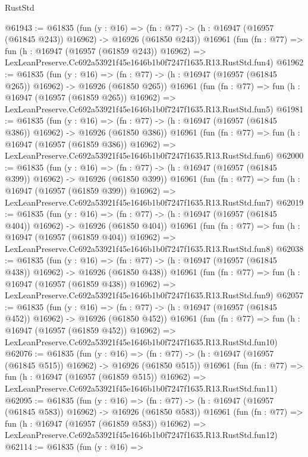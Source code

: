 \begin{lexlean}{RustStd}
\begin{coremodule}
@61943 := @61835
    (fun (y : @16) =>
    (fn : @77) -> (h : @16947 (@16957 (@61845 @243)) @16962) -> @16926 (@61850 @243))
    @16961
    (fun (fn : @77) =>
    fun (h : @16947 (@16957 (@61859 @243)) @16962) =>
    LexLeanPreserve.Cc692a53921f45e1646b1b0f7247f1635.R13.RustStd.fun4)
@61962 := @61835
    (fun (y : @16) =>
    (fn : @77) -> (h : @16947 (@16957 (@61845 @265)) @16962) -> @16926 (@61850 @265))
    @16961
    (fun (fn : @77) =>
    fun (h : @16947 (@16957 (@61859 @265)) @16962) =>
    LexLeanPreserve.Cc692a53921f45e1646b1b0f7247f1635.R13.RustStd.fun5)
@61981 := @61835
    (fun (y : @16) =>
    (fn : @77) -> (h : @16947 (@16957 (@61845 @386)) @16962) -> @16926 (@61850 @386))
    @16961
    (fun (fn : @77) =>
    fun (h : @16947 (@16957 (@61859 @386)) @16962) =>
    LexLeanPreserve.Cc692a53921f45e1646b1b0f7247f1635.R13.RustStd.fun6)
@62000 := @61835
    (fun (y : @16) =>
    (fn : @77) -> (h : @16947 (@16957 (@61845 @399)) @16962) -> @16926 (@61850 @399))
    @16961
    (fun (fn : @77) =>
    fun (h : @16947 (@16957 (@61859 @399)) @16962) =>
    LexLeanPreserve.Cc692a53921f45e1646b1b0f7247f1635.R13.RustStd.fun7)
@62019 := @61835
    (fun (y : @16) =>
    (fn : @77) -> (h : @16947 (@16957 (@61845 @404)) @16962) -> @16926 (@61850 @404))
    @16961
    (fun (fn : @77) =>
    fun (h : @16947 (@16957 (@61859 @404)) @16962) =>
    LexLeanPreserve.Cc692a53921f45e1646b1b0f7247f1635.R13.RustStd.fun8)
@62038 := @61835
    (fun (y : @16) =>
    (fn : @77) -> (h : @16947 (@16957 (@61845 @438)) @16962) -> @16926 (@61850 @438))
    @16961
    (fun (fn : @77) =>
    fun (h : @16947 (@16957 (@61859 @438)) @16962) =>
    LexLeanPreserve.Cc692a53921f45e1646b1b0f7247f1635.R13.RustStd.fun9)
@62057 := @61835
    (fun (y : @16) =>
    (fn : @77) -> (h : @16947 (@16957 (@61845 @452)) @16962) -> @16926 (@61850 @452))
    @16961
    (fun (fn : @77) =>
    fun (h : @16947 (@16957 (@61859 @452)) @16962) =>
    LexLeanPreserve.Cc692a53921f45e1646b1b0f7247f1635.R13.RustStd.fun10)
@62076 := @61835
    (fun (y : @16) =>
    (fn : @77) -> (h : @16947 (@16957 (@61845 @515)) @16962) -> @16926 (@61850 @515))
    @16961
    (fun (fn : @77) =>
    fun (h : @16947 (@16957 (@61859 @515)) @16962) =>
    LexLeanPreserve.Cc692a53921f45e1646b1b0f7247f1635.R13.RustStd.fun11)
@62095 := @61835
    (fun (y : @16) =>
    (fn : @77) -> (h : @16947 (@16957 (@61845 @583)) @16962) -> @16926 (@61850 @583))
    @16961
    (fun (fn : @77) =>
    fun (h : @16947 (@16957 (@61859 @583)) @16962) =>
    LexLeanPreserve.Cc692a53921f45e1646b1b0f7247f1635.R13.RustStd.fun12)
@62114 := @61835
    (fun (y : @16) =>

\end{coremodule}
\end{lexlean}
